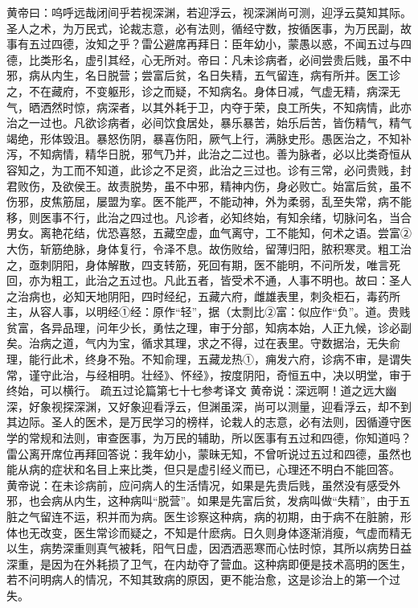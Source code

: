 \documentclass[a4paper,12pt,UTF8,twoside]{ctexbook}
\begin{document}
黄帝曰：呜呼远哉闭间乎若视深渊，若迎浮云，视深渊尚可测，迎浮云莫知其际。圣人之术，为万民式，论裁志意，必有法则，循经守数，按循医事，为万民副，故事有五过四德，汝知之乎？雷公避席再拜日：臣年幼小，蒙愚以惑，不闻五过与四德，比类形名，虚引其经，心无所对。帝曰：凡未诊病者，必间尝贵后贱，虽不中邪，病从内生，名日脱营；尝富后贫，名日失精，五气留连，病有所并。医工诊之，不在藏府，不变躯形，诊之而疑，不知病名。身体日减，气虚无精，病深无气，晒洒然时惊，病深者，以其外耗于卫，内夺于荣，良工所失，不知病情，此亦治之一过也。凡欲诊病者，必间饮食居处，暴乐暴苦，始乐后苦，皆伤精气，精气竭绝，形体毁沮。暴怒伤阴，暴喜伤阳，厥气上行，满脉史形。愚医治之，不知补泻，不知病情，精华日脱，邪气乃并，此治之二过也。善为脉者，必以比类奇恒从容知之，为工而不知道，此诊之不足资，此治之三过也。诊有三常，必问贵贱，封君败伤，及欲侯王。故责脱势，虽不中邪，精神内伤，身必败亡。始富后贫，虽不伤邪，皮焦筋屈，屡盟为挛。医不能严，不能动神，外为柔弱，乱至失常，病不能移，则医事不行，此治之四过也。凡诊者，必知终始，有知余绪，切脉问名，当合男女。离艳花结，优恐喜怒，五藏空虚，血气离守，工不能知，何术之语。尝富②大伤，斩筋绝脉，身体复行，令泽不息。故伤败给，留薄归阳，脓积寒灵。粗工治之，亟刺阴阳，身体解散，四支转筋，死回有期，医不能明，不问所发，唯言死回，亦为粗工，此治之五过也。凡此五者，皆受术不通，人事不明也。故曰：圣人之治病也，必知天地阴阳，四时经纪，五藏六府，雌雄表里，刺灸柜石，毒药所主，从容人事，以明经①经：原作“轻”，据（太剽比②富：似应作“负”。道。贵贱贫富，各异品理，问年少长，勇怯之理，审于分部，知病本始，人正九候，诊必副矣。治病之道，气内为宝，循求其理，求之不得，过在表里。守数据治，无失俞理，能行此术，终身不殆。不知俞理，五藏龙热①，痈发六府，诊病不审，是谓失常，谨守此治，与经相明。壮经》、怀经》，按度阴阳，奇恒五中，决以明堂，审于终始，可以横行。
疏五过论篇第七十七参考译文
黄帝说：深远啊！道之远大幽深，好象视探深渊，又好象迎看浮云，但渊虽深，尚可以测量，迎看浮云，却不到其边际。圣人的医术，是万民学习的榜样，论栽人的志意，必有法则，因循遵守医学的常规和法则，审查医事，为万民的辅助，所以医事有五过和四德，你知道吗？雷公离开席位再拜回答说：我年幼小，蒙昧无知，不曾听说过五过和四德，虽然也能从病的症状和名目上来比类，但只是虚引经义而已，心理还不明白不能回答。
黄帝说：在未诊病前，应问病人的生活情况，如果是先贵后贱，虽然没有感受外邪，也会病从内生，这种病叫“脱营”。如果是先富后贫，发病叫做“失精”，由于五脏之气留连不运，积并而为病。医生诊察这种病，病的初期，由于病不在脏腑，形体也无改变，医生常诊而疑之，不知是什麽病。日久则身体逐渐消瘦，气虚而精无以生，病势深重则真气被耗，阳气日虚，因洒洒恶寒而心怯时惊，其所以病势日益深重，是因为在外耗损了卫气，在内劫夺了营血。这种病即便是技术高明的医生，若不问明病人的情况，不知其致病的原因，更不能治愈，这是诊治上的第一个过失。
\end{document}
